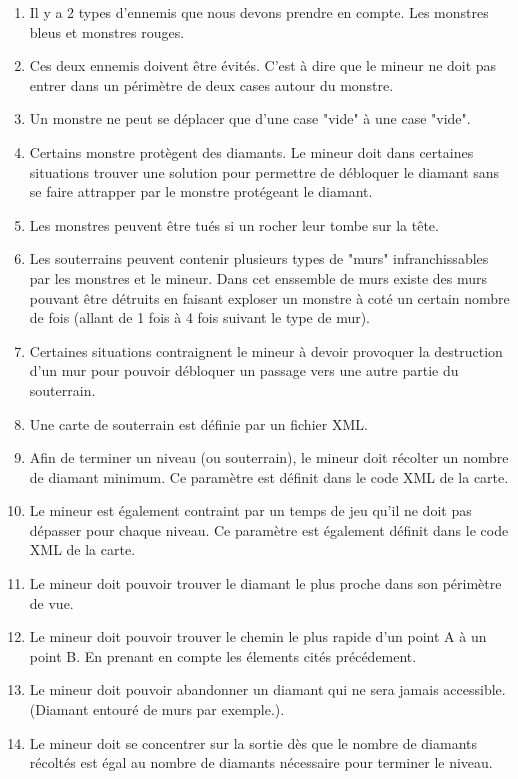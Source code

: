 \documentclass[a4paper,11pt]{article}
\begin{document}
\begin{enumerate}
			\item Il y a 2 types d'ennemis que nous devons prendre en compte. Les monstres bleus et monstres rouges.
			\item Ces deux ennemis doivent \^etre \'evit\'es. C'est \`a dire que le mineur ne doit pas entrer dans un p\'erim\`etre de deux cases autour du monstre.
			\item Un monstre ne peut se d\'eplacer que d'une case "vide" \`a une case "vide".
			\item Certains monstre prot\`egent des diamants. Le mineur doit dans certaines situations trouver une solution pour permettre de d\'ebloquer le diamant sans se faire attrapper par le monstre prot\'egeant le diamant.
			\item Les monstres peuvent \^etre tu\'es si un rocher leur tombe sur la t\^ete.
			\item Les souterrains peuvent contenir plusieurs types de "murs" infranchissables par les monstres et le mineur. Dans cet enssemble de murs existe des murs pouvant \^etre d\'etruits en faisant exploser un monstre \`a cot\'e un certain nombre de fois (allant de 1 fois \`a 4 fois suivant le type de mur).
			\item Certaines situations contraignent le mineur \`a devoir provoquer la destruction d'un mur pour pouvoir d\'ebloquer un passage vers une autre partie du souterrain.
			\item Une carte de souterrain est d\'efinie par un fichier XML.
			\item Afin de terminer un niveau (ou souterrain), le mineur doit r\'ecolter un nombre de diamant minimum. Ce param\`etre est d\'efinit dans le code XML de la carte.
			\item Le mineur est \'egalement contraint par un temps de jeu qu'il ne doit pas d\'epasser pour chaque niveau. Ce param\`etre est \'egalement d\'efinit dans le code XML de la carte.
			\item Le mineur doit pouvoir trouver le diamant le plus proche dans son p\'erim\`etre de vue.
			\item Le mineur doit pouvoir trouver le chemin le plus rapide d'un point A \`a un point B. En prenant en compte les \'elements cit\'es pr\'ec\'edement.
			\item Le mineur doit pouvoir abandonner un diamant qui ne sera jamais accessible. (Diamant entour\'e de murs par exemple.).
			\item Le mineur doit se concentrer sur la sortie d\`es que le nombre de diamants r\'ecolt\'es est \'egal au nombre de diamants n\'ecessaire pour terminer le niveau.
		\end{enumerate}
		
\end{document}
